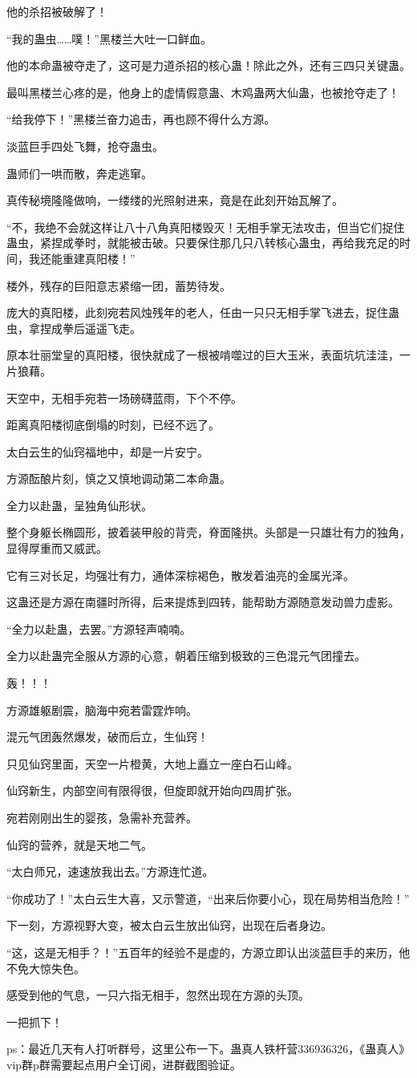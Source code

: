 \begin{this_body}
他的杀招被破解了！

“我的蛊虫……噗！”黑楼兰大吐一口鲜血。

他的本命蛊被夺走了，这可是力道杀招的核心蛊！除此之外，还有三四只关键蛊。

最叫黑楼兰心疼的是，他身上的虚情假意蛊、木鸡蛊两大仙蛊，也被抢夺走了！

“给我停下！”黑楼兰奋力追击，再也顾不得什么方源。

淡蓝巨手四处飞舞，抢夺蛊虫。

蛊师们一哄而散，奔走逃窜。

真传秘境隆隆做响，一缕缕的光照射进来，竟是在此刻开始瓦解了。

“不，我绝不会就这样让八十八角真阳楼毁灭！无相手掌无法攻击，但当它们捉住蛊虫，紧捏成拳时，就能被击破。只要保住那几只八转核心蛊虫，再给我充足的时间，我还能重建真阳楼！”

楼外，残存的巨阳意志紧缩一团，蓄势待发。

庞大的真阳楼，此刻宛若风烛残年的老人，任由一只只无相手掌飞进去，捉住蛊虫，拿捏成拳后遥遥飞走。

原本壮丽堂皇的真阳楼，很快就成了一根被啃噬过的巨大玉米，表面坑坑洼洼，一片狼藉。

天空中，无相手宛若一场磅礴蓝雨，下个不停。

距离真阳楼彻底倒塌的时刻，已经不远了。

太白云生的仙窍福地中，却是一片安宁。

方源酝酿片刻，慎之又慎地调动第二本命蛊。

全力以赴蛊，呈独角仙形状。

整个身躯长椭圆形，披着装甲般的背壳，脊面隆拱。头部是一只雄壮有力的独角，显得厚重而又威武。

它有三对长足，均强壮有力，通体深棕褐色，散发着油亮的金属光泽。

这蛊还是方源在南疆时所得，后来提炼到四转，能帮助方源随意发动兽力虚影。

“全力以赴蛊，去罢。”方源轻声喃喃。

全力以赴蛊完全服从方源的心意，朝着压缩到极致的三色混元气团撞去。

轰！！！

方源雄躯剧震，脑海中宛若雷霆炸响。

混元气团轰然爆发，破而后立，生仙窍！

只见仙窍里面，天空一片橙黄，大地上矗立一座白石山峰。

仙窍新生，内部空间有限得很，但旋即就开始向四周扩张。

宛若刚刚出生的婴孩，急需补充营养。

仙窍的营养，就是天地二气。

“太白师兄，速速放我出去。”方源连忙道。

“你成功了！”太白云生大喜，又示警道，“出来后你要小心，现在局势相当危险！”

下一刻，方源视野大变，被太白云生放出仙窍，出现在后者身边。

“这，这是无相手？！”五百年的经验不是虚的，方源立即认出淡蓝巨手的来历，他不免大惊失色。

感受到他的气息，一只六指无相手，忽然出现在方源的头顶。

一把抓下！

ps：最近几天有人打听群号，这里公布一下。蛊真人铁杆营336936326，《蛊真人》vip群p群需要起点用户全订阅，进群截图验证。

\end{this_body}


